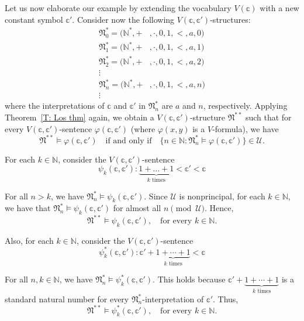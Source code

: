 \documentclass{scrartcl}
\begin{document}
\begin{example}
Let us now elaborate our example by extending the vocabulary $V(\mathbb{c})$ with a new constant symbol $\mathbb{c}'$. Consider now the following $V(\mathbb{c},\mathbb{c}')$-structures:
\begin{align*}
\mathfrak{N}^*_0 = (\mathbb{N}^*,+&,\cdot,0,1,<,a,0)\\
\mathfrak{N}^*_1 = (\mathbb{N}^*,+&,\cdot,0,1,<,a, 1)\\
\mathfrak{N}^*_2 = (\mathbb{N}^*,+&,\cdot,0,1,<,a, 2)\\
\vdots\\
\mathfrak{N}^*_n = (\mathbb{N}^*,+&,\cdot,0,1,<,a, n)\\
\vdots
\end{align*}
where the interpretations of $\mathbb{c}$ and $\mathbb{c}'$ in $\mathfrak{N}^*_n$ are $a$ and $n$, respectively.
Applying Theorem~\ref{T: Los thm} again, we obtain a $V(\mathbb{c},\mathbb{c}')$-structure $\mathfrak{N}^{**}$ such that for every $V(\mathbb{c},\mathbb{c}')$-sentence $\varphi(\mathbb{c},\mathbb{c}')$ (where $\varphi(x,y)$ is a $V$-formula), we have 
\[
\mathfrak{N}^{**}\models \varphi(\mathbb{c},\mathbb{c}') 
\quad
\text{if and only if}
\quad
 \{n\in \mathbb{N}\colon \mathfrak{N}_n^*\models\varphi(\mathbb{c},\mathbb{c}')\}\in\mathscr{U} \text{.}
\]

For each $k\in\mathbb{N}$, consider the $V(\mathbb{c},\mathbb{c}')$-sentence
\[
\psi_k(\mathbb{c},\mathbb{c}') : 
\underbrace{1+\dots+1}_{k\text{ times}} < \mathbb{c}' < \mathbb{c}
\]

For all $n>k$, we have $\mathfrak{N}_n^*\models\psi_k(\mathbb{c},\mathbb{c}')$. Since $\mathscr{U}$ is nonprincipal, for each $k\in\mathbb{N}$, we have that $\mathfrak{N}_n^*\models\psi_k(\mathbb{c},\mathbb{c}')$ for almost all $n\pmod{\mathscr{U}}$. Hence, 
\[
\mathfrak{N}^{**} 
\models \psi_k(\mathbb{c},\mathbb{c}'),
\quad
\text{for every $k\in\mathbb{N}$}.
\]

Also, for each $k\in\mathbb{N}$, consider the $V(\mathbb{c},\mathbb{c}')$-sentence
\[
\psi^*_k(\mathbb{c},\mathbb{c}') :
\mathbb{c}'+\underbrace{1+\cdots+1}_{k\text{ times}}<\mathbb{c}
\]

For all $n,k\in\mathbb{N}$, we have $\mathfrak{N}^*_n\models\psi^*_k(\mathbb{c},\mathbb{c}')$. This holds because $\mathbb{c}'+\underbrace{1+\cdots+1}_{k\text{ times}}$ is a standard natural number for every $\mathfrak{N}^*_n$-interpretation of $\mathbb{c}'$. Thus,
\[
\mathfrak{N}^{**}\models\psi^*_k(\mathbb{c},\mathbb{c}'),
\quad
\text{for every $k\in\mathbb{N}$}.
\]


\end{example}
\end{document}
